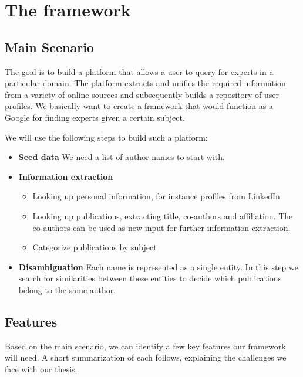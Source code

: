 \chapter{The framework}
\label{framework}

\section{Main Scenario}

The goal is to build a platform that allows a user to query for experts in a particular domain. The platform extracts and unifies the required information from a variety of online sources and subsequently builds a repository of user profiles. We basically want to create a framework that would function as a Google for finding experts given a certain subject.

We will use the following steps to build such a platform:


\begin{itemize}
	\item \textbf{Seed data} We need a list of author names to start with.
	\item \textbf{Information extraction}
		\begin{itemize}
			\item Looking up personal information, for instance profiles from LinkedIn.
			\item Looking up publications, extracting title, co-authors and affiliation. The co-authors can be used as new input for further information extraction.
			\item Categorize publications by subject
		\end{itemize}
	\item \textbf{Disambiguation} Each name is represented as a single entity. In this step we search for similarities between these entities to decide which publications belong to the same author.
\end{itemize}

\section{Features}

Based on the main scenario, we can identify a few key features our framework will need. A short summarization of each follows, explaining the challenges we face with our thesis.

